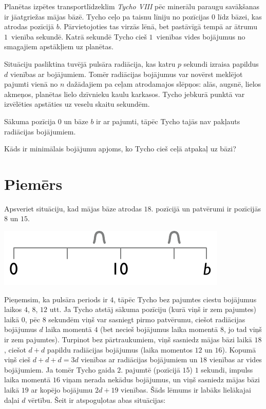 

\noindent
Planētas izpētes transportlīdzeklim \emph{Tycho VIII} pēc minerālu paraugu savākšanas ir jāatgriežas mājas bāzē.
Tycho ceļo pa taisnu līniju no pozīcijas $0$ līdz bāzei, kas atrodas pozīcijā $b$.
Pārvietojoties tas virzās lēnā, bet pastāvīgā tempā ar ātrumu $1$~vienība sekundē.
Katrā sekundē Tycho cieš $1$~vienības vides bojājumus no smagajiem apstākļiem uz planētas.

Situāciju pasliktina tuvējā pulsāra radiācija, kas katru $p$ sekundi izraisa papildus $d$ vienības ar bojājumiem.
Tomēr radiācijas bojājumus var novērst meklējot pajumti vienā no $n$ dažādajiem pa ceļam atrodamajos slēpņos: alās, augsnē, lielos akmeņos, planētas lielo dzīvnieku kaulu karkasos.
Tycho jebkurā punktā var izvēlēties apstāties uz veselu skaitu sekundēm.

Sākuma pozīcija $0$ un bāze $b$ ir ar pajumti, tāpēc Tycho tajās nav pakļauts radiācijas bojājumiem.

\medskip
Kāds ir minimālais bojājumu apjoms, ko Tycho cieš ceļā atpakaļ uz bāzi?

\section*{Piemērs}

Apsveriet situāciju, kad mājas bāze atrodas $18$. pozīcijā un patvērumi ir pozīcijās $8$ un $15$.

\includegraphics[width=.3\textwidth]{img/samplesetup}

Pieņemsim, ka pulsāra periods ir $4$, tāpēc Tycho bez pajumtes ciestu bojājumus laikos $4$, $8$, $12$ utt.
Ja Tycho atstāj sākuma pozīciju (kurā viņš ir zem pajumtes) laikā $0$, pēc $8$ sekundēm viņš var sasniegt pirmo patvērumu, ciešot radiācijas bojājumus $d$ laika momentā $4$ (bet necieš bojājumus laika momentā $8$, jo tad viņš ir zem pajumtes).
Turpinot bez pārtraukumiem, viņš sasniedz mājas bāzi laikā $18$, ciešot $d+d$ papildu radiācijas bojājumus (laika momentos $12$ un $16$).
Kopumā viņš cieš $d+d+d=3d$ vienības ar radiācijas bojājumiem un $18$ vienības ar vides bojājumiem.
Ja tomēr Tycho gaida $2.$ pajumtē (pozīcijā $15$) $1$ sekundi, impulss laika momentā $16$ viņam nerada nekādus bojājumus, un viņš sasniedz mājas bāzi laikā $19$ ar kopējo bojājumu $2d + 19$ vienības.
Šāds lēmums ir labāks lielākajai daļai $d$ vērtību.
Šeit ir atspoguļotas abas situācijas:

